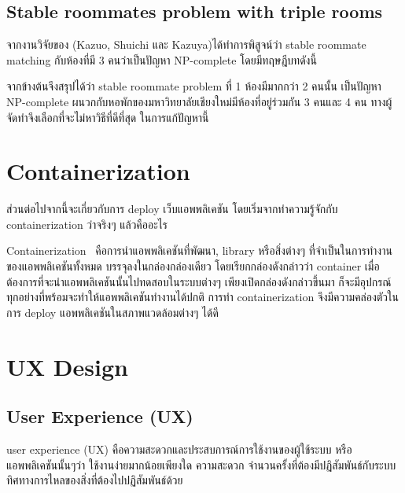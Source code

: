 \subsection{Stable roommates problem with triple rooms}
จากงานวิจัยของ (Kazuo, Shuichi และ Kazuya)\cite{iwama2007stable}ได้ทำการพิสูจน์ว่า
stable roommate matching กับห้องที่มี 3 คนว่าเป็นปัญหา NP-complete โดยมีทฤษฎีบทดังนี้


จากข้างต้นจึงสรุปได้ว่า stable roommate problem ที่ 1 ห้องมีมากกว่า 2 คนนั้น
เป็นปัญหา NP-complete ผนวกกับหอพักของมหาวิทยาลัยเชียงใหม่มีห้องที่อยู่ร่วมกัน 3 คนและ 4 คน
ทางผู้จัดทำจึงเลือกที่จะไม่หาวิธีที่ดีที่สุด ในการแก้ปัญหานี้

\section{Containerization}
ส่วนต่อไปจากนี้จะเกี่ยวกับการ deploy เว็บแอพพลิเคชัน โดยเริ่มจากทำความรู้จักกับ 
containerization ว่าจริงๆ แล้วคืออะไร

Containerization~\cite{ctnrh} คือการนำแอพพลิเคชันที่พัฒนา, library หรือสิ่งต่างๆ ที่จำเป็นในการทำงานของแอพพลิเคชันทั้งหมด บรรจุลงในกล่องกล่องเดียว โดยเรียกกล่องดังกล่าวว่า container 
เมื่อต้องการที่จะนำแอพพลิเคชันนั้นไปทดสอบในระบบต่างๆ เพียงเปิดกล่องดังกล่าวขึ้นมา
ก็จะมีอุปกรณ์ทุกอย่างที่พร้อมจะทำให้แอพพลิเคชันทำงานได้ปกติ การทำ containerization 
จึงมีความคล่องตัวในการ deploy แอพพลิเคชันในสภาพแวดล้อมต่างๆ ได้ดี 

\section{UX Design}
\subsection{User Experience (UX)}
user experience (UX) คือความสะดวกและประสบการณ์การใช้งานของผู้ใช้ระบบ 
หรือแอพพลิเคชันนั้นๆว่า ใช้งานง่ายมากน้อยเพียงใด ความสะดวก จำนวนครั้งที่ต้องมีปฏิสัมพันธ์กับระบบ
ทิศทางการไหลของสิ่งที่ต้องไปปฏิสัมพันธ์ด้วย
